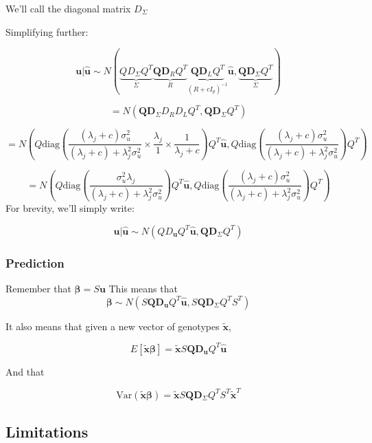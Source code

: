 We'll call the diagonal matrix \(D_\Sigma\)

Simplifying further:

$$\textbf{u}|\hat{\textbf{u}} \sim N(\underbrace{Q D_\Sigma Q^{T}}_\Sigma \underbrace{\textbf{Q}\textbf{D}_{R}Q^{T}}_R \underbrace{\textbf{Q}\textbf{D}_LQ^{T}}_{(R+cI_p)^{-1}}\hat{\textbf{u}},\underbrace{\textbf{Q}\textbf{D}_\Sigma Q^{T}}_\Sigma)$$

$$= N(\textbf{Q}\textbf{D}_\Sigma D_R D_LQ^{T},\textbf{Q}\textbf{D}_\Sigma Q^{T})$$

$$= N\left( Q \text{diag}\left( \frac{(\lambda_j+c)\sigma_u^2}{(\lambda_j+c)+\lambda_j^2\sigma_u^2} \times \frac{\lambda_j}{1} \times \frac{1}{\lambda_j+c} \right)Q^{T}\hat{\textbf{u}},Q \text{diag}\left(\frac{(\lambda_j+c)\sigma_u^2}{(\lambda_j+c)+\lambda_j^2\sigma_u^2} \right)Q^{T} \right)$$

$$= N\left( Q \text{diag}\left( \frac{\sigma_u^2 \lambda_j}{(\lambda_j+c)+\lambda_j^2\sigma_u^2}  \right)Q^{T}\hat{\textbf{u}},Q \text{diag}\left(\frac{(\lambda_j+c)\sigma_u^2}{(\lambda_j+c)+\lambda_j^2\sigma_u^2} \right)Q^{T} \right)$$
For brevity, we'll simply write:

$$\textbf{u}|\hat{\textbf{u}} \sim N \left(Q D_{\textbf{u}}Q^{T}\hat{\textbf{u}},\textbf{Q}\textbf{D}_{\Sigma}Q^{T}\right)$$




\subsubsection{Prediction}\label{sec:org8cfb0b1}

Remember that \(\boldsymbol{\beta}=S\textbf{u}\) This means that 
$$\boldsymbol{\beta} \sim N( S\textbf{Q}\textbf{D}_{\textbf{u}}Q^{T}\hat{\textbf{u}},S\textbf{Q}\textbf{D}_\Sigma Q^{T}S^{T})$$

It also means that given a new vector of genotypes \(\tilde{\textbf{x}}\),

$$E[\tilde{\textbf{x}}\boldsymbol{\beta}]=\tilde{\textbf{x}}S\textbf{Q}\textbf{D}_\textbf{u}Q^{T}\hat{\textbf{u}}$$

And that 

$$\text{Var}(\tilde{\textbf{x}}\boldsymbol{\beta})=\tilde{\textbf{x}}S\textbf{Q}\textbf{D}_\Sigma Q^{T}S^{T}\tilde{\textbf{x}}^{T}$$



\subsection{Limitations}\label{sec:org2dc1c0d}

